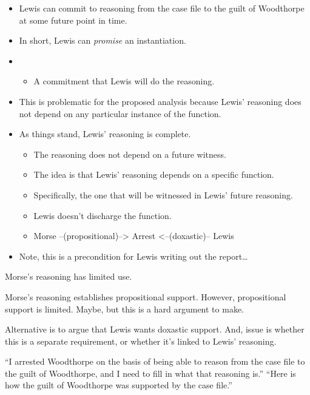 \documentclass[10pt]{article}
\begin{document}
\begin{itemize}
\item Lewis can commit to reasoning from the case file to the guilt of Woodthorpe at some future point in time.
\item In short, Lewis can \emph{promise} an instantiation.
\item 
  \begin{itemize}
  \item A commitment that Lewis will do the reasoning.
  \end{itemize}
\item This is problematic for the proposed analysis because Lewis' reasoning does not depend on any particular instance of the function.
\item As things stand, Lewis' reasoning is complete.
  \begin{itemize}
  \item The reasoning does not depend on a future witness.
  \item The idea is that Lewis' reasoning depends on a specific function.
  \item Specifically, the one that will be witnessed in Lewis' future reasoning.
  \item Lewis doesn't discharge the function.
  \item Morse --(propositional)--> Arrest <--(doxastic)-- Lewis
  \end{itemize}
\item {\color{red} Note, this is a precondition for Lewis writing out the report\dots}
\end{itemize}

\begin{note}
  Morse's reasoning has limited use.

  Morse's reasoning establishes propositional support.
  However, propositional support is limited.
  Maybe, but this is a hard argument to make.

  Alternative is to argue that Lewis wants doxastic support.
  And, issue is whether this is a separate requirement, or whether it's linked to Lewis' reasoning.

  ``I arrested Woodthorpe on the basis of being able to reason from the case file to the guilt of Woodthorpe, and I need to fill in what that reasoning is.''
  ``Here is how the guilt of Woodthorpe was supported by the case file.''
\end{note}
\end{document}
